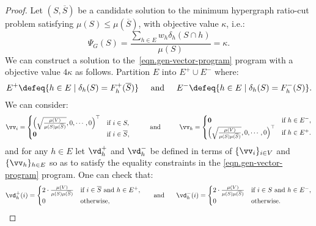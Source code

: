 \documentclass[letterpaper]{article}
\begin{document}
\genrelaxation*
\begin{proof}
    Let $(S,\overline{S})$ be a candidate solution to the minimum hypergraph ratio-cut problem satisfying $\mu(S)
    \leq \mu(\overline{S})$, with objective value $\kappa$, i.e.:
    \[
        \Psi_G(S) = \frac{\sum_{h \in E} w_h \delta_h(S\cap h)}{\mu(S)}  = \kappa.
    \]
    We can construct a solution to the~\ref{eqn.gen-vector-program} program with a objective value $4\kappa$ as follows. Partition $E$ into $E^+ \cup E^-$ where:
    \[
        E^+ \defeq \{h\in E \mid \delta_h(S) = F_h^+(\overline{S})\} \hspace{0.5cm}\text{and}\hspace{0.5cm} E^- \defeq \{h\in E \mid \delta_h(S) = F_h^-(S)\}.
    \]
    We can consider:
    \[
        \vv_i = \begin{cases}
                   \left(\sqrt{\mu(V) \over \mu(S)\mu(\overline{S})}, 0 , \cdots , 0 \right)^\top &\text{if } i\in S,\\
                   \boldsymbol{0} & \text{if }i\in \overline{S},
                \end{cases}
        \hspace{1cm}\text{and}\hspace{1cm}
        \vv_h = \begin{cases}
            \boldsymbol{0} & \text{if } h\in E^-,\\
            \left(\sqrt{\mu(V) \over \mu(S)\mu(\overline{S})}, 0 , \cdots , 0 \right)^\top &\text{if } h \in E^+.
        \end{cases}
    \]
    and for any $h\in E$ let $\vd_h^+$ and $\vd_h^-$ be defined in terms of $\{\vv_i\}_{i\in V}$ and $\{\vv_h\}_{h\in E}$ so as to satisfy the equality constraints in the \ref{eqn.gen-vector-program} program. One can check that:
    \[
        \vd_h^+(i) = \begin{cases}
            2 \cdot{\mu(V)\over\mu(S) \mu(\overline{S})}&\text{if }i\in \overline{S}\text{ and }h\in E^+,\\
            0 & \text{otherwise,}
        \end{cases}
        \hspace{0.5cm}\text{ and }\hspace{0.5cm}\vd_h^-(i) = \begin{cases}
            2 \cdot{\mu(V)\over\mu(S) \mu(\overline{S})}&\text{if }i\in S\text{ and }h\in E^-,\\
            0 & \text{otherwise.}
        \end{cases}
    \]


\end{proof}
\end{document}

